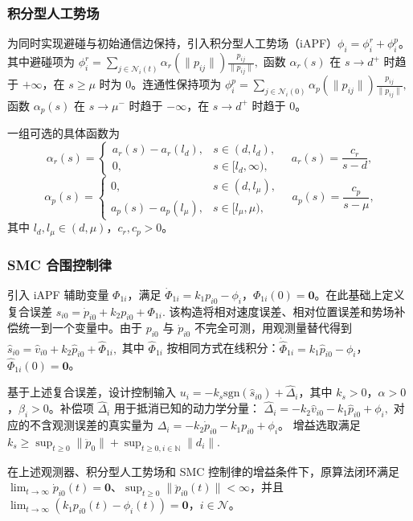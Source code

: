 \subsubsection{积分型人工势场}

为同时实现避碰与初始通信边保持，引入积分型人工势场（iAPF）$\phi_i=\phi_i^r+\phi_i^p$。其中避碰项为
$\phi_i^r=\sum_{j\in\mathcal{N}_i(t)}\alpha_r(\|p_{ij}\|)\frac{p_{ij}}{\|p_{ij}\|},$
函数 $\alpha_r(s)$ 在 $s\to d^+$ 时趋于 $+\infty$，在 $s\ge \mu$ 时为 $0$。连通性保持项为
$\phi_i^p=\sum_{j\in\mathcal{N}_i(0)}\alpha_p(\|p_{ij}\|)\frac{p_{ij}}{\|p_{ij}\|},$
函数 $\alpha_p(s)$ 在 $s\to \mu^-$ 时趋于 $-\infty$，在 $s\to d^+$ 时趋于 $0$。

一组可选的具体函数为
$$
\alpha_r(s)=
\begin{cases}
a_r(s)-a_r(l_d), & s\in(d,l_d),\\
0, & s\in[l_d,\infty),
\end{cases}
\quad
a_r(s)=\frac{c_r}{s-d},
$$
$$
\alpha_p(s)=
\begin{cases}
0, & s\in(d,l_\mu),\\
a_p(s)-a_p(l_\mu), & s\in[l_\mu,\mu),
\end{cases}
\quad
a_p(s)=\frac{c_p}{s-\mu},
$$
其中 $l_d,l_\mu\in(d,\mu)$，$c_r,c_p>0$。

\subsubsection{SMC 合围控制律}

引入 iAPF 辅助变量 $\Phi_{1i}$，满足 $\dot\Phi_{1i}=k_1p_{i0}-\phi_i$，$\Phi_{1i}(0)=\mathbf{0}$。在此基础上定义复合误差
$s_{i0}=\dot p_{i0}+k_2p_{i0}+\Phi_{1i}.$
该构造将相对速度误差、相对位置误差和势场补偿统一到一个变量中。由于 $p_{i0}$ 与 $\dot p_{i0}$ 不完全可测，用观测量替代得到
$\hat s_{i0}=\hat v_{i0}+k_2\hat p_{i0}+\hat\Phi_{1i},$
其中 $\hat\Phi_{1i}$ 按相同方式在线积分：$\dot{\hat\Phi}_{1i}=k_1\hat p_{i0}-\phi_i$，$\hat\Phi_{1i}(0)=\mathbf{0}$。

基于上述复合误差，设计控制输入 $u_i=-k_s \mathrm{sgn}(\hat s_{i0})+\hat\Delta_i$，其中 $k_s>0$，$\alpha>0$，$\beta_i>0$。补偿项 $\hat\Delta_i$ 用于抵消已知的动力学分量：
$\hat\Delta_i=-k_2\hat v_{i0}-k_1\hat p_{i0}+\phi_i,$
对应的不含观测误差的真实量为 $\Delta_i=-k_2\dot p_{i0}-k_1p_{i0}+\phi_i$。
增益选取满足
$k_s \ge \sup_{t\geq 0}\|\ddot{p}_0\| + \sup_{t\geq 0,i\in\mathbb{N}}\|d_i\|$.

\begin{lemma}
在上述观测器、积分型人工势场和 SMC 控制律的增益条件下，原算法闭环满足 $\lim_{t\to\infty}\dot p_{i0}(t)=\mathbf{0}$、$\sup_{t\geq0}\|\ddot p_{i0}(t)\|<\infty$，并且 $\lim_{t\to\infty}(k_1p_{i0}(t)-\phi_i(t))=\mathbf{0}$，$i\in\mathcal{N}$。
\end{lemma}

